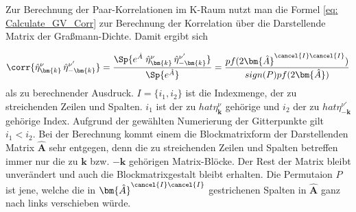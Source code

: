 Zur Berechnung der Paar-Korrelationen im K-Raum nutzt man die Formel \eqref{eq: Calculate_GV_Corr} zur Berechnung der Korrelation über die Darstellende Matrix der Graßmann-Dichte. Damit ergibt sich 

\begin{equation} 
    \corr{\hat{\eta}_{\bm{k}}^{\nu}\, \hat{\eta}_{-\bm{k}}^{\nu'}} 
    =
    \frac{\Sp{e^{\hat{A}}\;\hat{\eta}_{\bm{k}}^{\nu}\, \hat{\eta}_{-\bm{k}}^{\nu'}}}{\Sp{e^{\hat{A}}}} 
    = 
    \frac{pf(2\bm{\hat{A}}^{\cancel{I} \cancel{I}}) }{sign(P) pf(2\bm{\hat{A}})} 
\end{equation} 
als zu berechnender Ausdruck. $I = \{i_{1}, i_{2} \}$ ist die Indexmenge, der zu streichenden Zeilen und Spalten. $i_{1}$ ist der zu $hat{\eta}_{\bm{k}}^{\nu}$ gehörige  und $i_{2}$ der zu $hat{\eta}_{-\bm{k}}^{\nu'}$ gehörige Index. Aufgrund der gewählten Numerierung der Gitterpunkte gilt $i_{1} < i_2$. Bei der Berechnung kommt einem die Blockmatrixform der Darstellenden Matrix $\bm{\hat{A}}$ sehr entgegen, denn die zu streichenden Zeilen und Spalten betreffen immer nur die zu $\bm{k}$ bzw. $\bm{-k}$ gehörigen Matrix-Blöcke. Der Rest der Matrix bleibt unverändert und auch die Blockmatrixgestalt bleibt erhalten. Die Permutaion $P$ ist jene, welche die in $\bm{\hat{A}}^{\cancel{I} \cancel{I}}$ gestrichenen Spalten in $\bm{\hat{A}}$ ganz nach links verschieben würde. 

